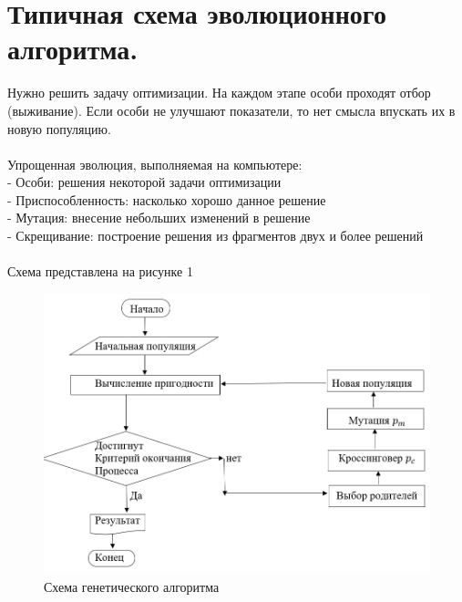 \section{Типичная схема эволюционного алгоритма.}
Нужно решить задачу оптимизации. На каждом этапе особи проходят отбор (выживание). Если особи не улучшают показатели, то  нет смысла впускать их в новую популяцию.  \\
     \\
Упрощенная эволюция, выполняемая на компьютере:\\
- Особи: решения некоторой задачи оптимизации \\
- Приспособленность: насколько хорошо данное решение\\
- Мутация: внесение небольших изменений в решение\\
- Скрещивание: построение решения из фрагментов двух и более решений\\
\\
Схема представлена на рисунке 1
\begin{figure}[h]
\centering
\includegraphics[width=0.8\linewidth]{images/Sxema.jpg}
\caption{Схема генетического алгоритма}
\label{fig:mpr}
\end{figure}
